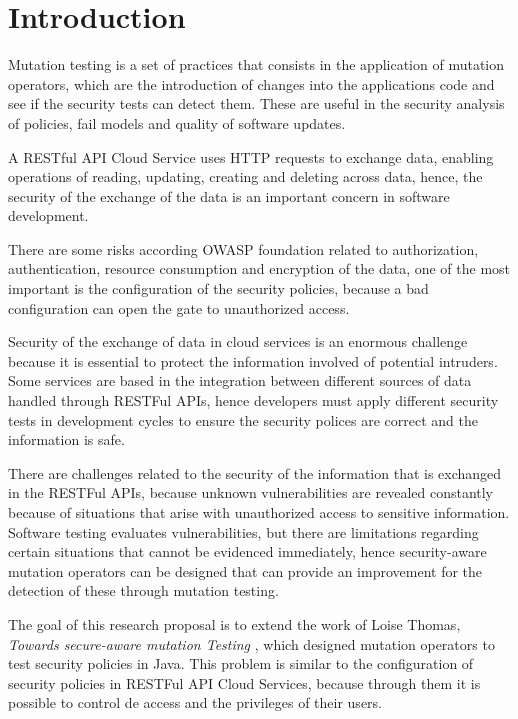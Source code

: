 \chapter*{Introduction}

Mutation testing is a set of practices that consists in the application of mutation operators, which are the introduction of changes into the applications code and see if the security tests can detect them. These are useful in the security analysis of policies\cite{8967426}, fail models\cite{6569774} and quality of software updates\cite{kravets2012feasibility}.

A RESTful API Cloud Service uses HTTP requests to exchange data, enabling operations of reading, updating, creating and deleting across data, hence, the security of the exchange of the data is an important concern in software development.

There are some risks according OWASP foundation related to authorization, authentication, resource consumption and encryption of the data, one of the most important is the configuration of the security policies, because a bad configuration can open the gate to unauthorized access.

Security of the exchange of data in cloud services is an enormous challenge because it is essential to protect the information involved of potential intruders. Some services are based in the integration between different sources of data handled through RESTFul APIs, hence developers must apply different security tests in development cycles to ensure the security polices are correct and the information is safe.

There are challenges related to the security of the information that is exchanged in the RESTFul APIs, because unknown vulnerabilities are revealed constantly because of situations that arise with unauthorized access to sensitive information. Software testing evaluates vulnerabilities, but there are limitations regarding certain situations that cannot be evidenced immediately, hence security-aware mutation operators can be designed that can provide an improvement for the detection of these through mutation testing.

The goal of this research proposal is to extend the work of Loise Thomas, \textit{Towards secure-aware mutation Testing} \cite{Loise2017}, which designed mutation operators to test security policies in Java. This problem is similar to the configuration of security policies in RESTFul API Cloud Services, because through them it is possible to control de access and the privileges of their users.

